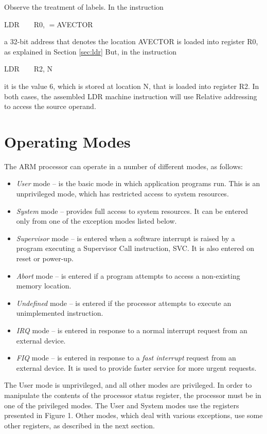 \documentclass[11pt, twoside, pdftex]{article}
\begin{document}
\noindent
Observe the treatment of labels. In the instruction
\begin{center}
LDR~~~~R0, $=$AVECTOR
\end{center}
\noindent
a 32-bit address that denotes the location AVECTOR is loaded
into register R0, as explained in Section \ref{sec:ldr} But, in the instruction
\begin{center}
LDR~~~~R2, N
\end{center}
\noindent
it is the value 6, which is stored at location N, that is
loaded into register R2. In both cases, the assembled LDR
machine instruction will use Relative addressing to access
the source operand.

\section{Operating Modes}
\label{sec:modes}

The ARM processor can operate in a number of different modes,
as follows:
\begin{itemize}
\item {\it User} mode -- is the basic mode in which application
programs run. This is an unprivileged mode, which has restricted
access to system resources.
\item {\it System} mode -- provides full access to system
resources. It can be entered only from one of the exception
modes listed below.
\item {\it Supervisor} mode -- is entered when a software
interrupt is raised by a program executing a Supervisor Call
instruction, SVC. It is also entered on reset or power-up.
\item {\it Abort} mode -- is entered if a program attempts to
access a non-existing memory location.
\item {\it Undefined} mode -- is entered if the processor
attempts to execute an unimplemented instruction.
\item {\it IRQ} mode -- is entered in response to a normal
interrupt request from an external device.
\item {\it FIQ} mode -- is entered in response to a
{\it fast interrupt} request from an external device.
It is used to provide faster service for more urgent requests.
\end{itemize}

\noindent
The User mode is unprivileged, and all other modes are
privileged. In order to manipulate the contents of the processor
status register, the processor must be in one of the privileged
modes. The User and System modes use the registers presented
in Figure 1. Other modes, which deal with various exceptions,
use some other registers, as described in the next section.
\end{document}
